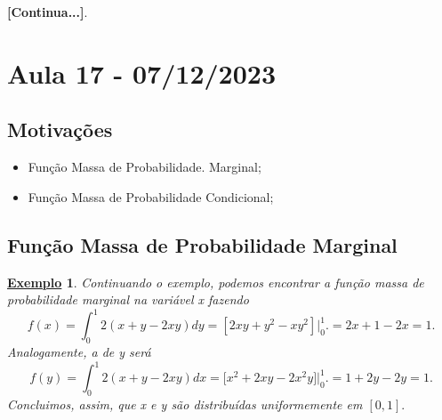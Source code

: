 \documentclass{article}
\newtheorem{example}{\underline{Exemplo}}
\begin{document}
\textbf{[Continua...]}.
\newpage

\section{Aula 17 - 07/12/2023}
\subsection{Motivações} 
\begin{itemize}
  \item Função Massa de Probabilidade. Marginal;
  \item Função Massa de Probabilidade Condicional;
\end{itemize}
\subsection{Função Massa de Probabilidade Marginal}
\begin{example}
  Continuando o exemplo, podemos encontrar a função massa de probabilidade marginal na variável x fazendo 
  \[
    f(x) = \int_{0}^{1}2(x+y - 2xy)dy = [2xy + y^{2} - xy^{2}]\biggl|_{0}^{1}\biggr. = 2x + 1 - 2x = 1.
  \]
  Analogamente, a de y será 
  \[
    f(y) = \int_{0}^{1}2(x+y-2xy)dx = \biggl[x^{2} + 2xy - 2x^{2}y\biggr]\biggl|_{0}^{1}\biggr. = 1 + 2y - 2y = 1.
  \]
  Concluimos, assim, que x e y são distribuídas uniformemente em \([0, 1].\)
\end{example}
\end{document}

